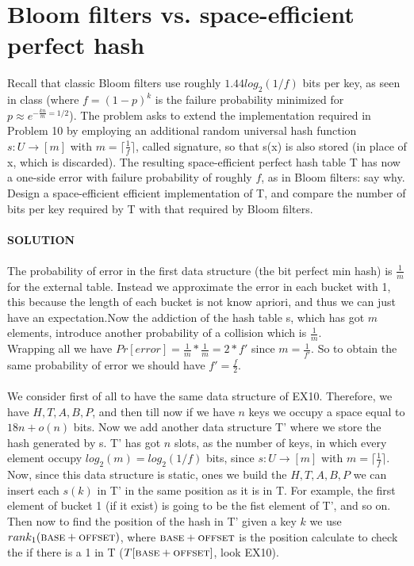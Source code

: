 \documentclass[a4paper]{article}
\newcommand\ceil[1]{\lceil#1\rceil}
\begin{document}
\section*{Bloom filters vs. space-efficient perfect hash}
Recall that classic Bloom filters use roughly $1.44 log_2(1/f)$ bits per key, as seen in class (where $f = (1 − p)^k$ is the failure probability minimized for $p \approx e^{− \frac{kn}{m}= 1/2}$). The problem asks to extend the implementation required in Problem 10 by employing an additional random universal hash function $s : U \rightarrow [m]$ with $m =\ceil{\frac{1}{f}}$, called signature, so that s(x) is also stored (in
place of x, which is discarded). The resulting space-efficient perfect hash table T has now a one-side error with failure probability of roughly $f$, as in Bloom filters: say why. Design a space-efficient efficient implementation of T, and compare the number of bits per key required by T with that required by Bloom filters.
\\
\\
\textbf{SOLUTION}
\\
\\
The probability of error in the first data structure (the bit perfect min hash) is $\frac{1}{m}$ for the external table. Instead we approximate the error in each bucket with 1, this because the length of each bucket is not know apriori, and thus we can just have an expectation.Now the addiction of the hash table s, which has got $m$ elements, introduce another probability of a collision which is $\frac{1}{m}$. \\
Wrapping all we have $Pr[error]=\frac{1}{m}*\frac{1}{m}=2*f'$ since $m=\frac{1}{f'}$. So to obtain the same probability of error we should have $f'=\frac{f}{2}$.
\\
\\
We consider first of all to have the same data structure of EX10. Therefore, we have $H,T,A,B,P$, and then till now if we have $n$ keys we occupy a space equal to $18n + o(n)$ bits. Now we add another data structure T' where we store the hash generated by s. T' has got $n$ slots, as the number of keys, in which every element occupy $log_2(m)=log_2(1/f)$ bits, since $s : U \rightarrow [m]$ with $m =\ceil{\frac{1}{f}}$. Now, since this data structure is static, ones we build the $H,T,A,B,P$ we can insert each $s(k)$ in T' in the same position as it is in T. For example, the first element of bucket 1 (if it exist) is going to be the fist element of T', and so on. Then now to find the position of the hash in T' given a key $k$ we use $rank_1(\textsc{base}+\textsc{offset})$, where $\textsc{base}+\textsc{offset}$ is the position calculate to check the if there is a 1 in T ($T[\textsc{base}+\textsc{offset}]$, look EX10).
\end{document}
